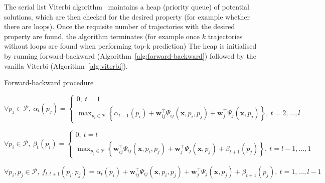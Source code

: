
The serial list Viterbi algorithm~\cite{nilsson2001sequentially,seshadri1994list} maintains
a heap (\ie priority queue) of potential solutions, which are then checked for the desired property (for example
whether there are loops). Once the requisite number of trajectories with the desired
property are found, the algorithm terminates (for example once $k$ trajectories without loops are found when performing top-k prediction)
The heap is initialised by running forward-backward (Algorithm~\ref{alg:forward-backward}) followed by the vanilla Viterbi (Algorithm~\ref{alg:viterbi}).

\begin{algorithm}[htbp]
\caption{Forward-backward procedure~\cite{rabiner1989tutorial}}
\label{alg:forward-backward}
\begin{algorithmic}[1]
  \STATE $\forall p_j \in \mathcal{P},~ \alpha_t(p_j) =
          \begin{cases}
          0,~ t = 1 \\
          \max_{p_i \in \mathcal{P}} \left\{ \alpha_{t-1}(p_i) + \mathbf{w}_{ij}^\top \Psi_{ij}(\mathbf{x}, p_i, p_j) +
          \mathbf{w}_j^\top \Psi_j(\mathbf{x}, p_j) \right\},~ t=2,\dots,l
          \end{cases}$

  \STATE $\forall p_i \in \mathcal{P},~ \beta_t(p_i) =
          \begin{cases}
          0,~ t = l \\
          \max_{p_j \in \mathcal{P}} \left\{ \mathbf{w}_{ij}^\top \Psi_{ij}(\mathbf{x}, p_i, p_j) +
          \mathbf{w}_j^\top \Psi_j(\mathbf{x}, p_j) + \beta_{t+1}(p_j) \right\},~ t = l-1,\dots,1
          \end{cases}$

  \STATE $\forall p_i, p_j \in \mathcal{P},~ f_{t,t+1}(p_i, p_j) = \alpha_t(p_i) + \mathbf{w}_{ij}^\top \Psi_{ij}(\mathbf{x}, p_i, p_j) +
                                \mathbf{w}_j^\top \Psi_j(\mathbf{x}, p_j) + \beta_{t+1}(p_j),~ t = 1,\dots,l-1$
\end{algorithmic}
\end{algorithm}

